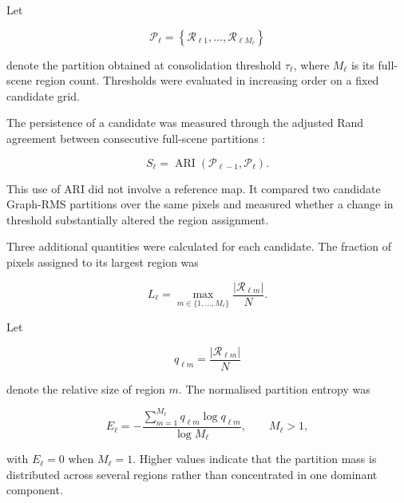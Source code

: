 \documentclass[10pt,a4paper,fleqn]{article}
\begin{document}
Let

\begin{equation}
\mathcal{P}_{\ell}
=
\left\{
\mathcal{R}_{\ell 1},
\ldots,
\mathcal{R}_{\ell M_{\ell}}
\right\}
\label{eq:candidate_partition}
\end{equation}

denote the partition obtained at consolidation threshold
\(\tau_{\ell}\), where \(M_{\ell}\) is its full-scene region count.
Thresholds were evaluated in increasing order on a fixed candidate grid.

The persistence of a candidate was measured through the adjusted Rand
agreement between consecutive full-scene partitions
\citep{hubert1985}:

\begin{equation}
S_{\ell}
=
\operatorname{ARI}
\left(
\mathcal{P}_{\ell-1},
\mathcal{P}_{\ell}
\right).
\label{eq:selector_stability}
\end{equation}

This use of ARI did not involve a reference map. It compared two candidate
Graph-RMS partitions over the same pixels and measured whether a change in
threshold substantially altered the region assignment.

Three additional quantities were calculated for each candidate. The fraction
of pixels assigned to its largest region was

\begin{equation}
L_{\ell}
=
\max_{m\in\{1,\ldots,M_{\ell}\}}
\frac{
\left|
\mathcal{R}_{\ell m}
\right|
}{N}.
\label{eq:largest_region_fraction}
\end{equation}

Let

\begin{equation}
q_{\ell m}
=
\frac{
\left|
\mathcal{R}_{\ell m}
\right|
}{N}
\label{eq:region_proportion}
\end{equation}

denote the relative size of region \(m\). The normalised partition entropy was

\begin{equation}
E_{\ell}
=
-\frac{
\displaystyle
\sum_{m=1}^{M_{\ell}}
q_{\ell m}\log q_{\ell m}
}{
\log M_{\ell}
},
\qquad
M_{\ell}>1,
\label{eq:normalized_partition_entropy}
\end{equation}

with \(E_{\ell}=0\) when \(M_{\ell}=1\). Higher values indicate that the
partition mass is distributed across several regions rather than concentrated
in one dominant component.
\end{document}
